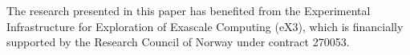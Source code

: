 The research presented in this paper has benefited from the Experimental Infrastructure for Exploration of Exascale Computing (eX3), which is financially supported by the Research Council of Norway under contract 270053.
